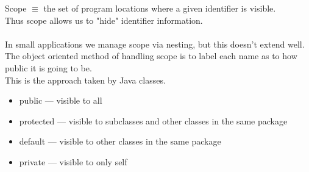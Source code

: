 \documentclass[../../lecture_notes.tex]{subfiles}
\begin{document}
Scope $\equiv$ the set of program locations where a given identifier is visible.\\
Thus scope allows us to "hide" identifier information.\\
\\
In small applications we manage scope via nesting, but this doesn’t extend well.\\
The object oriented method of handling scope is to label each name as to how public it is going to be.\\
	This is the approach taken by Java classes. \begin{itemize} [itemsep=0mm]
		\item public — visible to all
		\item protected — visible to subclasses and other classes in the same package
		\item default — visible to other classes in the same package
		\item private — visible to only self
	\end{itemize}
\end{document}
